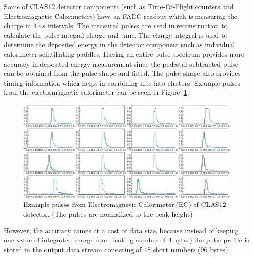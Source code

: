 Some of CLAS12 detector components (such as Time-Of-Flight counters and Electromagnetic Calorimeters) have an FADC readout which is measuring the charge in $4~ns$ intervals. The measured pulses are used in reconstruction to calculate the pulse integral charge and time. The charge integral is used to determine the deposited energy in the detector component such as individual calorimeter scintillating paddles. Having an entire pulse spectrum provides more accuracy in deposited energy measurement since the pedestal subtracted pulse can be obtained from the pulse shape and fitted. The pulse shape also provides timing information which helps in combining hits into clusters. Example pulses from the electormagnetic calorimeter can be seen in Figure~\ref{fig:pulse_examples}.
\begin{figure}[h!]
\centering
\includegraphics[width=0.9\columnwidth]{ec_pulse_examples.pdf}
\caption{ Example pulses from Electromagnetic Calorimeter (EC) of CLAS12 detector. (The pulses are normalized to the peak height)}
\label{fig:pulse_examples}
\end{figure}
However, the accuracy comes at a cost of data size, because instead of keeping one value of integrated charge (one floating number of 4 bytes) the pulse profile is stored in the output data stream consisting of 48 short numbers (96 bytes). 

